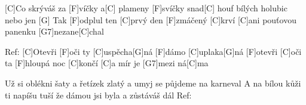 
[C]Co skrýváš za [F]víčky a[C] plameny [F]svíčky
snad[C] houf bílých holubic nebo jen [G]
Tak [F]odplul ten [C]prvý den [F]zmáčený [C]krví
[C]ani pouťovou panenku [G7]nezane[C]chal

Ref:
[C]Otevři [F]oči ty [C]uspěcha[G]ná
[F]dámo [C]uplaka[G]ná
[F]otevři [C]oči ta [F]hloupá noc [C]končí
[C]a mír je [G7]mezi ná[C]ma

Už si oblékni šaty a řetízek zlatý
a umyj se půjdeme na karneval
A na bílou kůži ti napíšu tuší
že dámou jsi byla a zůstáváš dál
Ref: